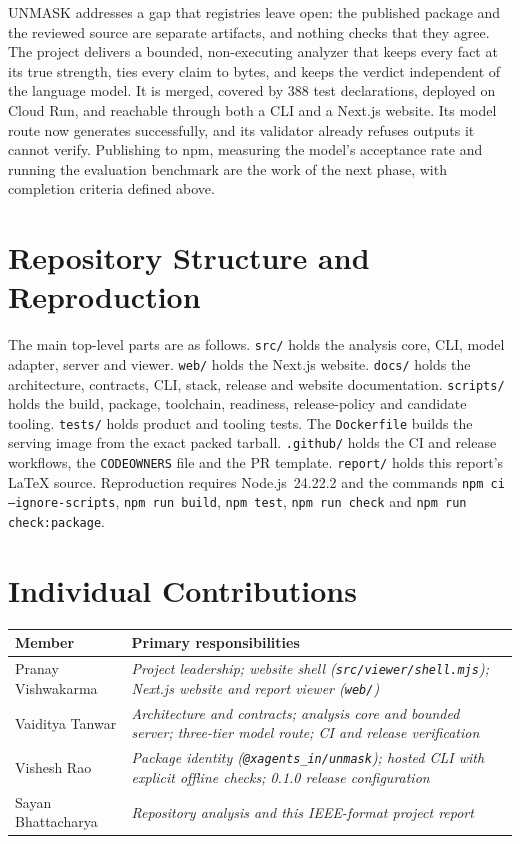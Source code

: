 \documentclass[conference]{IEEEtran}
\makeatletter
\newcommand{\AuthorOneName}{Pranay Vishwakarma}
\newcommand{\AuthorTwoName}{Vaiditya Tanwar}
\newcommand{\AuthorThreeName}{Vishesh Rao}
\newcommand{\AuthorFourName}{Sayan Bhattacharya}
\newcommand{\AuthorOneWork}{Project leadership; website shell (\texttt{src/viewer/shell.mjs}); Next.js website and report viewer (\texttt{web/})}
\newcommand{\AuthorTwoWork}{Architecture and contracts; analysis core and bounded server; three-tier model route; CI and release verification}
\newcommand{\AuthorThreeWork}{Package identity (\texttt{@xagents\_in/unmask}); hosted CLI with explicit offline checks; 0.1.0 release configuration}
\newcommand{\AuthorFourWork}{Repository analysis and this IEEE-format project report}
\newcommand{\code}[1]{\texttt{#1}}
\makeatother
\begin{document}
UNMASK addresses a gap that registries leave open: the published package and
the reviewed source are separate artifacts, and nothing checks that they agree.
The project delivers a bounded, non-executing analyzer that keeps every fact at
its true strength, ties every claim to bytes, and keeps the verdict independent
of the language model. It is merged, covered by 388 test declarations, deployed
on Cloud Run, and reachable through both a CLI and a Next.js website. Its model
route now generates successfully, and its validator already refuses outputs it
cannot verify. Publishing to npm, measuring the model's acceptance rate and
running the evaluation benchmark are the work of the next phase, with
completion criteria defined above.

\appendices

\section{Repository Structure and Reproduction}
The main top-level parts are as follows. \code{src/} holds
the analysis core, CLI, model adapter, server and viewer. \code{web/} holds the
Next.js website. \code{docs/} holds the architecture, contracts, CLI, stack,
release and website documentation. \code{scripts/} holds the build, package,
toolchain, readiness, release-policy and candidate tooling. \code{tests/} holds
product and tooling tests. The \code{Dockerfile} builds the serving image from
the exact packed tarball. \code{.github/} holds the CI and release workflows, the
\code{CODEOWNERS} file and the PR template. \code{report/} holds this report's
LaTeX source. Reproduction requires Node.js~24.22.2 and the commands
\code{npm ci --ignore-scripts}, \code{npm run build}, \code{npm test},
\code{npm run check} and \code{npm run check:package}.

\section{Individual Contributions}

\begin{center}
\footnotesize
\begin{tabular}{@{}p{2.3cm}p{5.4cm}@{}}
\toprule
\textbf{Member} & \textbf{Primary responsibilities}\\
\midrule
\AuthorOneName & \textit{\AuthorOneWork}\\
\AuthorTwoName & \textit{\AuthorTwoWork}\\
\AuthorThreeName & \textit{\AuthorThreeWork}\\
\AuthorFourName & \textit{\AuthorFourWork}\\
\bottomrule
\end{tabular}
\end{center}
\end{document}

